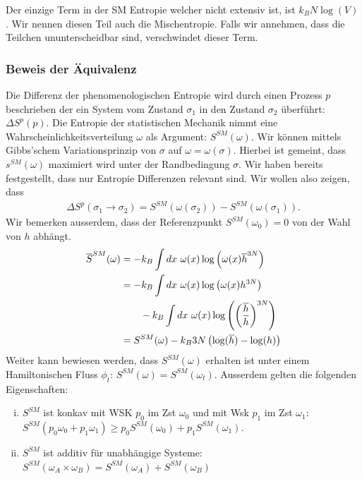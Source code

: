 Der einzige Term in der SM Entropie welcher nicht extensiv ist, ist $k_B N
\log(V)$. Wir nennen diesen Teil auch die Mischentropie. Falls wir annehmen,
dass die Teilchen ununterscheidbar sind, verschwindet dieser Term.


\subsubsection{Beweis der Äquivalenz}

Die Differenz der phenomenologischen Entropie wird durch einen Prozess $p$
beschrieben der ein System vom Zustand $\sigma_1$ in den Zustand $\sigma_2$
überführt: $\Delta S^p (p)$. Die Entropie der statistischen Mechanik nimmt
eine Wahrscheinlichkeitsverteilung $\omega$ als Argument: $S^{SM} (\omega)$.
Wir können mittels Gibbs'schem Variationsprinzip von $\sigma$ auf $\omega
= \omega(\sigma)$. Hierbei ist gemeint, dass $s^{SM}(\omega)$ maximiert wird
unter der Randbedingung $\sigma$. Wir haben bereits festgestellt, dass nur
Entropie Differenzen relevant sind. Wir wollen also zeigen, dass
\begin{align*}
    \Delta S^p (\sigma_1 \rightarrow \sigma_2) =
    S^{SM} (\omega(\sigma_2)) - S^{SM} (\omega(\sigma_1)).
\end{align*}
Wir bemerken ausserdem, dass der Referenzpunkt $S^{SM}(\omega_0) = 0$
von der Wahl von $h$ abhängt.
\begin{align*}
    \overline{S}^{SM} (\omega) &=
    - k_B \int dx \ \omega(x) \log \left( \omega(x) \overline{h}^{3N} \right)
    \\
    &= - k_B \int dx \ \omega(x) \log \left( \omega(x) h^{3N} \right)
    \\ &\hspace{20pt} - k_B \int dx \ \omega(x) \log \left( \left( \frac{\overline{h}}{h} \right)^{3N} \right)
    \\
    &= S^{SM} (\omega) - k_B 3N \left( \log(\overline{h}) - \log(h) \right)
\end{align*}
Weiter kann bewiesen werden, dass $S^{SM} (\omega)$ erhalten ist unter einem
Hamiltonischen Fluss $\phi_t$: $S^{SM} (\omega) = S^{SM} (\omega_t)$. Ausserdem
gelten die folgenden Eigenschaften:
\begin{enumerate}[(i)]
    \item $S^{SM}$ ist konkav mit WSK $p_0$ im Zst $\omega_0$ und mit Wsk
        $p_1$ im Zst $\omega_1$: $S^{SM} (p_0 \omega_0 + p_1 \omega_1) \geq
        p_0 S^{SM} (\omega_0) + p_1 S^{SM} (\omega_1)$.
    \item $S^{SM}$ ist additiv für unabhängige Systeme:
        $S^{SM} (\omega_A \times \omega_B) = S^{SM} (\omega_A) + S^{SM} (\omega_B)$
\end{enumerate}

